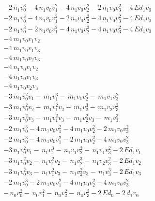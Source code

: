 \documentclass{article}
\begin{document}
\begin{equation}
\label{polynomial system}
\begin{array}{r}
-2 \, n_{1} v_{0}^{3} - 4 \, n_{1} v_{0} v_{1}^{2} - 4 \, n_{1} v_{0} v_{2}^{2} - 2 \, n_{1} v_{0} v_{3}^{2} - 4 \, E d_{1} v_{0} \\
-2 \, n_{1} v_{0}^{3} - 4 \, n_{1} v_{0} v_{1}^{2} - 2 \, n_{1} v_{0} v_{2}^{2} - 4 \, n_{1} v_{0} v_{3}^{2} - 4 \, E d_{1} v_{0} \\
-2 \, n_{1} v_{0}^{3} - 2 \, n_{1} v_{0} v_{1}^{2} - 4 \, n_{1} v_{0} v_{2}^{2} - 4 \, n_{1} v_{0} v_{3}^{2} - 4 \, E d_{1} v_{0} \\
-4 \, m_{1} v_{0} v_{1} v_{2} \\
-4 \, m_{1} v_{0} v_{1} v_{3} \\
-4 \, m_{1} v_{0} v_{2} v_{3} \\
-4 \, n_{1} v_{0} v_{1} v_{2} \\
-4 \, n_{1} v_{0} v_{1} v_{3} \\
-4 \, n_{1} v_{0} v_{2} v_{3} \\
-3 \, m_{1} v_{0}^{2} v_{1} -  \, m_{1} v_{1}^{3} -  \, m_{1} v_{1} v_{2}^{2} -  \, m_{1} v_{1} v_{3}^{2} \\
-3 \, m_{1} v_{0}^{2} v_{2} -  \, m_{1} v_{1}^{2} v_{2} -  \, m_{1} v_{2}^{3} -  \, m_{1} v_{2} v_{3}^{2} \\
-3 \, m_{1} v_{0}^{2} v_{3} -  \, m_{1} v_{1}^{2} v_{3} -  \, m_{1} v_{2}^{2} v_{3} -  \, m_{1} v_{3}^{3} \\
-2 \, m_{1} v_{0}^{3} - 4 \, m_{1} v_{0} v_{1}^{2} - 4 \, m_{1} v_{0} v_{2}^{2} - 2 \, m_{1} v_{0} v_{3}^{2} \\
-2 \, m_{1} v_{0}^{3} - 4 \, m_{1} v_{0} v_{1}^{2} - 2 \, m_{1} v_{0} v_{2}^{2} - 4 \, m_{1} v_{0} v_{3}^{2} \\
-3 \, n_{1} v_{0}^{2} v_{1} -  \, n_{1} v_{1}^{3} -  \, n_{1} v_{1} v_{2}^{2} -  \, n_{1} v_{1} v_{3}^{2} - 2 \, E d_{1} v_{1} \\
-3 \, n_{1} v_{0}^{2} v_{2} -  \, n_{1} v_{1}^{2} v_{2} -  \, n_{1} v_{2}^{3} -  \, n_{1} v_{2} v_{3}^{2} - 2 \, E d_{1} v_{2} \\
-3 \, n_{1} v_{0}^{2} v_{3} -  \, n_{1} v_{1}^{2} v_{3} -  \, n_{1} v_{2}^{2} v_{3} -  \, n_{1} v_{3}^{3} - 2 \, E d_{1} v_{3} \\
-2 \, m_{1} v_{0}^{3} - 2 \, m_{1} v_{0} v_{1}^{2} - 4 \, m_{1} v_{0} v_{2}^{2} - 4 \, m_{1} v_{0} v_{3}^{2} \\
- \, n_{0} v_{0}^{2} -  \, n_{0} v_{1}^{2} -  \, n_{0} v_{2}^{2} -  \, n_{0} v_{3}^{2} - 2 \, E d_{0} - 2 \, d_{1} v_{0} \\

\end{array}
\end{equation}
\end{document}
